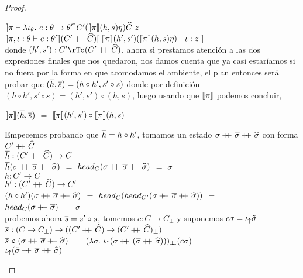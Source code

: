 \begin{proof}
\begin{itemize}
\begin{itemize}
$\llbracket \pi \vdash \lambda \iota_{\theta} . \ e : \theta \rightarrow \theta' \rrbracket
		C'(\llbracket \pi \rrbracket(h,s)\eta)\widehat{C} \ z$ $=$\\
$\semBrcks{\pi,\iota:\theta \vdash e : \theta'}(C' \concat \Chat)
			[ \ \semBrcks{\pi}(h',s')(\semBrcks{\pi}(h,s)\eta) \ | \ \iota:z \ ]$\\

donde $(h',s') : C' \rTo (C' \concat \Chat)$,
ahora si prestamos atenci\'on a las dos expresiones finales que nos quedaron, nos 
damos cuenta que ya casi estar\'iamos si no fuera por la forma en que acomodamos
el ambiente, el plan entonces ser\'a probar que $(\overline{h},\overline{s}) = (h \circ h',s'\circ s)$
donde por definici\'on $(h \circ h',s'\circ s) = (h',s') \circ (h,s)$, luego usando
que $\llbracket \pi \rrbracket$ podemos concluir,

\begin{center}
$\llbracket \pi \rrbracket(\overline{h},\overline{s})$ $=$ $\llbracket \pi \rrbracket(h',s') \circ \llbracket \pi \rrbracket(h,s)$
\end{center}

Empecemos probando que $\overline{h} = h \circ h'$, tomamos un estado 
$\sigma +\kern-1.3ex+\kern0.8ex \overline{\sigma} +\kern-1.3ex+\kern0.8ex \widehat{\sigma}$ con forma $C' +\kern-1.3ex+\kern0.8ex \widehat{C}$\\

$\overline{h} : (C' +\kern-1.3ex+\kern0.8ex \widehat{C}) \rightarrow C$\\
$\overline{h} (\sigma +\kern-1.3ex+\kern0.8ex \overline{\sigma} +\kern-1.3ex+\kern0.8ex \widehat{\sigma})$ $=$ 
$head_{C} (\sigma +\kern-1.3ex+\kern0.8ex \overline{\sigma} +\kern-1.3ex+\kern0.8ex \widehat{\sigma})$ $=$ $\sigma$\\

$h : C' \rightarrow C$\\
$h' : (C' +\kern-1.3ex+\kern0.8ex \widehat{C}) \rightarrow C'$\\
$(h \circ h') (\sigma +\kern-1.3ex+\kern0.8ex \overline{\sigma} +\kern-1.3ex+\kern0.8ex \widehat{\sigma})$ $=$
$head_{C}(head_{C'} (\sigma +\kern-1.3ex+\kern0.8ex \overline{\sigma} +\kern-1.3ex+\kern0.8ex \widehat{\sigma}))$ $=$\\
$head_{C}(\sigma +\kern-1.3ex+\kern0.8ex \overline{\sigma})$ $=$ $\sigma$\\

probemos ahora $\overline{s} = s' \circ s$, tomemos $c : C \rightarrow C_\bot$ y
suponemos $c \sigma = \iota_{\uparrow} \tilde{\sigma}$\\

$\overline{s} : (C \rightarrow C_\bot) \rightarrow 
		  ((C' +\kern-1.3ex+\kern0.8ex \widehat{C}) \rightarrow (C' +\kern-1.3ex+\kern0.8ex \widehat{C})_\bot)$\\
$\overline{s} \ c \ (\sigma +\kern-1.3ex+\kern0.8ex \overline{\sigma} +\kern-1.3ex+\kern0.8ex \widehat{\sigma})$ $=$
$(\lambda \sigma . \ 
	\iotabot (\sigma \concat (\sigmaover \concat \sigmahat)))_{\dbot} (c \sigma)$ $=$\\
$\iota_{\uparrow} (\tilde{\sigma} +\kern-1.3ex+\kern0.8ex \overline{\sigma} +\kern-1.3ex+\kern0.8ex \widehat{\sigma})$\\


\end{itemize}
\end{itemize}
\end{proof}
